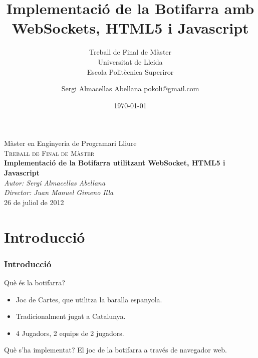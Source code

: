 \documentclass[notitlepage]{beamer}
\title[Implementació de la botifarra a través de Web]{Implementació de la Botifarra amb WebSockets, HTML5 i Javascript }
\subtitle{Treball de Final de Màster\\Universitat de Lleida\\Escola Politècnica Superiror}
\author{Sergi Almacellas Abellana pokoli@gmail.com}
\date{\today}
\begin{document}
\begin{frame}
\begin{center} 

\Large Màster en Enginyeria de Programari Lliure\\
\textsc{\LARGE Treball de Final de Màster}\\[0.5cm]


{\huge \bf Implementació de la Botifarra utilitzant WebSocket, HTML5 i Javascript } \\[0.75cm]

\textsl{Autor: Sergi Almacellas Abellana}\\
\textsl{Director: Juan Manuel Gimeno Illa}\\ 

\vfill{26 de juliol de 2012}
\end{center}
\end{frame}

\begin{frame}
\tableofcontents
\end{frame}

\section{Introducció}
\begin{frame}
\frametitle{Introducció}
\begin{block}{Què és la botifarra?}
\begin{itemize}
    \item{Joc de Cartes, que utilitza la baralla espanyola.}
    \item{Tradicionalment jugat a Catalunya.}
    \item{4 Jugadors, 2 equips de 2 jugadors.}
\end{itemize}
\end{block}

\begin{block}{Què s'ha implementat?}
El joc de la botifarra a través de navegador web.
\end{block}
\end{frame}
\end{document}
